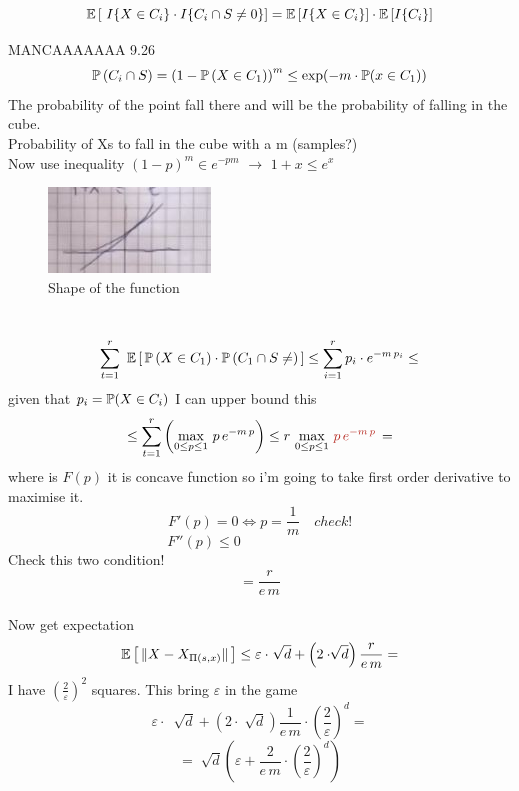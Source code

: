 \documentclass[../main.tex]{subfiles}
\begin{document}
$$
\mathbb{E} 
\left[ 
\ I \{ X \in C_i \}
\cdot  
I \{ C_i \cap S \neq 0 \} 
\right] 
= \mathbb{E} 
\left[ 
I \{ X \in C_i \} 
\right] 
\cdot 
\mathbb{E} 
\left[ I \{ C_i \right \} ]
$$

MANCAAAAAAA 9.26
\\
$$
\mathbb{P} \left( C_i \cap S \right)  = \left( 1- \mathbb{P} \left( X \in C_1 \right) \right)^m \leq \exp (- m \cdot \mathbb{P} (x \in C_1 ))
$$
The probability of the point fall there and will be the probability of falling in the cube.
\\
Probability of Xs to fall in the cube with a m (samples?)
\\
Now use inequality $ (1 - p)^m \in e^{-pm}$ $\longrightarrow$ $1 + x \leq e^x$
\begin{figure}[h]
    \centering
    \includegraphics[width=0.2\linewidth]{../img/lez11-img3.JPG}
    \caption{Shape of the function}
\end{figure}\\
$$
\sum_{t = 1}^{r} \ \mathbb{E} \left[ \, \mathbb{P} \left(X \in C_1 \right) \cdot \mathbb{P} \left(C_1 \cap S \neq \right)\, \right] \leq \sum_{i = 1}^{r} p_i \cdot e^{-m \, p_i} \leq
$$
given that $p_i = \mathbb{P} (X \in C_i)$
I can upper bound this 
$$
\leq 
\sum_{t=1}^{r} 
\left(
 \max_{0 \leq p \leq 1} 
\, p \, e^{- m \, p} 
\right)
\leq
 r \, \max_{0 \leq p \leq 1} \, \red{p \, e ^{-m\,p}} \,  =
$$
where  is $F(p)$
it is concave function so i'm going to take first order derivative to maximise it.
\\
$$
F'(p) = 0 \Leftrightarrow p = \frac{1}{m} \quad check!
$$
$$
F''(p) \leq 0 \qquad \qquad \qquad \qquad 
$$
Check this two condition!
$$
 = \frac{r}{e \, m}
$$
\\
Now get expectation
\\
$$
\mathbb{E} \left[ \, \| X - X_{\Pi(s,x)} \| \, \right] 
\leq 
\varepsilon \cdot \ \sqrt[]{d} + \left( 2 \cdot \sqrt[]{d}\right) \frac{r}{e \, m} =
$$
I have $(\frac{2}{\varepsilon})^2$ squares.
This bring $\varepsilon$ in the game
$$
\varepsilon \cdot \ \sqrt[]{d} + \left( 2 \cdot \sqrt[]{d}\right) \frac{1}{e \, m} \cdot \left( \frac{2}{\varepsilon}\right)^d = 
$$
$$
= \sqrt[]{d} \left( \varepsilon + \frac{2}{e \, m } \cdot \left( \frac{2}{\varepsilon} \right)^d \right)
$$
\end{document}
